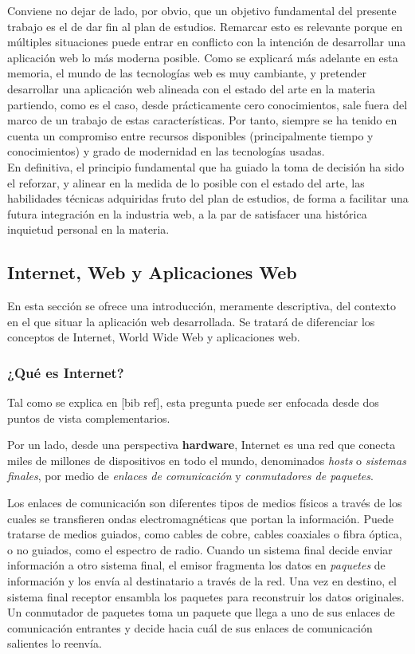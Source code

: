 \documentclass[a4paper]{article}
\begin{document}
    Conviene no dejar de lado, por obvio, que un objetivo fundamental del presente trabajo es el de dar fin al plan de estudios. Remarcar esto es relevante porque en múltiples situaciones puede entrar en conflicto con la intención de desarrollar una aplicación web lo más moderna posible. Como se explicará más adelante en esta memoria, el mundo de las tecnologías web es muy cambiante, y pretender desarrollar una aplicación web alineada con el estado del arte en la materia partiendo, como es el caso, desde prácticamente cero conocimientos, sale fuera del marco de un trabajo de estas características. Por tanto, siempre se ha tenido en cuenta un compromiso entre recursos disponibles (principalmente tiempo y conocimientos) y grado de modernidad en las tecnologías usadas.
    \\
    
    En definitiva, el principio fundamental que ha guiado la toma de decisión ha sido el reforzar, y alinear en la medida de lo posible con el estado del arte, las habilidades técnicas adquiridas fruto del plan de estudios, de forma a facilitar una futura integración en la industria web, a la par de satisfacer una histórica inquietud personal en la materia.


    \subsection{Internet, Web y Aplicaciones Web}
    En esta sección se ofrece una introducción, meramente descriptiva, del contexto en el que situar la aplicación web desarrollada. Se tratará de diferenciar los conceptos de Internet, World Wide Web y aplicaciones web.

    \subsubsection{¿Qué es Internet?}
    Tal como se explica en [bib ref], esta pregunta puede ser enfocada desde dos puntos de vista complementarios.
    
    Por un lado, desde una perspectiva \textbf{hardware}, Internet es una red que conecta miles de millones de dispositivos en todo el mundo, denominados \emph{hosts} o \emph{sistemas finales}, por medio de \emph{enlaces de comunicación} y \emph{conmutadores de paquetes}.
    
    Los enlaces de comunicación son diferentes tipos de medios físicos a través de los cuales se transfieren ondas electromagnéticas que portan la información. Puede tratarse de medios guiados, como cables de cobre, cables coaxiales o fibra óptica, o no guiados, como el espectro de radio. Cuando un sistema final decide enviar información a otro sistema final, el emisor fragmenta los datos en \emph{paquetes} de información y los envía al destinatario a través de la red. Una vez en destino, el sistema final receptor ensambla los paquetes para reconstruir los datos originales. Un conmutador de paquetes toma un paquete que llega a uno de sus enlaces de comunicación entrantes y decide hacia cuál de sus enlaces de comunicación salientes lo reenvía.
    
\end{document}
